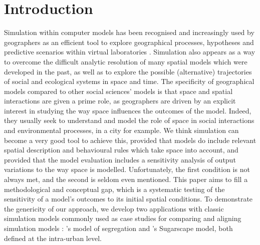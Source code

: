\documentclass[Afour,sageh,times]{sagej}
\begin{document}

\maketitle


\newpage

\section{Introduction}

Simulation within computer models has been recognised and increasingly used by geographers as an efficient tool to explore geographical processes, hypotheses and predictive scenarios within virtual laboratories \citep{batty1971modelling, batty2007model, carley1999generating, Quesneletal2009}.  Simulation also appears as a way to overcome the difficult analytic resolution of many spatial models which were developed in the past, as well as to explore the possible (alternative) trajectories of social and ecological systems in space and time. The specificity of geographical models compared to other social sciences' models is that space and spatial interactions are given a prime role, as geographers are driven by an explicit interest in studying the way space influences the outcomes of the model. Indeed, they usually seek to understand and model the role of space in social interactions and environmental processes, in a city for example. We think simulation can become a very good tool to achieve this, provided that models do include relevant spatial description and behavioural rules which take space into account, and provided that the model evaluation includes a sensitivity analysis of output variations to the way space is modelled. Unfortunately, the first condition is not always met, and the second is seldom even mentioned. This paper aims to fill a methodological and conceptual gap, which is a systematic testing of the sensitivity of a model's outcomes to its initial spatial conditions. To demonstrate the genericity of our approach, we develop two applications with classic simulation models commonly used as case studies for comparing and aligning simulation models \citep{Axtelletal1996, wilensky2007making}: \citet{schelling1971dynamic}'s model of segregation and \citet{EpsteinAxtell1996}'s Sugarscape model, both defined at the intra-urban level.\\
\end{document}
